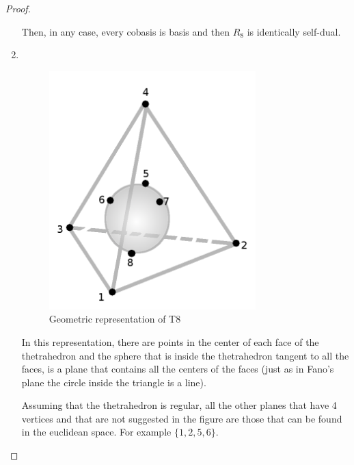 \begin{proof}
\begin{enumerate}[label=(\roman*)]
                Then, in any case, every cobasis is basis and then $R_8$ is identically self-dual.
        \item $\,$\pn
            \begin{figure}[H]
                \begin{center}
                    \includegraphics[width=8cm]{Test2/Problem7/T8GraphicRepresentation.png}
                \end{center}                            
                \caption{Geometric representation of T8}
                \label{t2:p7_T8GraphicRepresentation.png}                        
            \end{figure}\pn 
            
            In this representation, there are points in the center of each face of the thetrahedron and the sphere that is inside 
            the thetrahedron tangent to all the faces, is a plane that contains all the centers of the faces 
            (just as in Fano's plane the circle inside the triangle is a line).\pn
            
            Assuming that the thetrahedron is regular, all the other planes that have 4 vertices and that are not suggested in the
            figure are those that can be found in the euclidean space. For example $\{1, 2, 5, 6\}$.\pn
            

\end{enumerate}
\end{proof}
